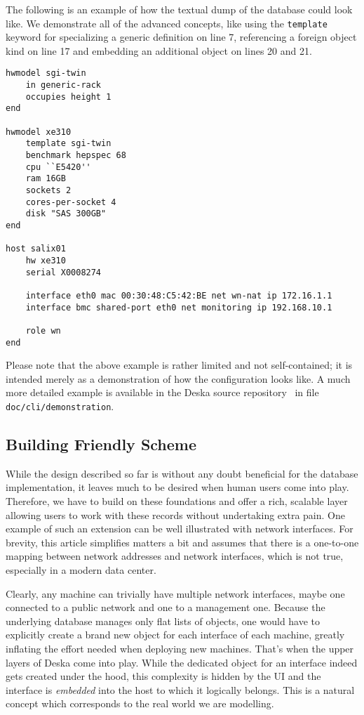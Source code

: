 \documentclass[a4paper]{jpconf}
\begin{document}
The following is an example of how the textual dump of the database could look like.  We demonstrate all of the advanced concepts, like
using the {\tt template} keyword for specializing a generic definition on line 7, referencing a foreign object kind on line 17 and
embedding an additional object on lines 20 and 21.

\lstset{numbers=left}
\noindent\begin{minipage}{\textwidth}
\begin{lstlisting}
hwmodel sgi-twin
    in generic-rack
    occupies height 1
end

hwmodel xe310
    template sgi-twin
    benchmark hepspec 68
    cpu ``E5420''
    ram 16GB
    sockets 2
    cores-per-socket 4
    disk "SAS 300GB"
end

host salix01
    hw xe310
    serial X0008274

    interface eth0 mac 00:30:48:C5:42:BE net wn-nat ip 172.16.1.1
    interface bmc shared-port eth0 net monitoring ip 192.168.10.1

    role wn
end
\end{lstlisting}
\end{minipage}

Please note that the above example is rather limited and not self-contained; it is intended merely as a demonstration of how the
configuration looks like.  A much more detailed example is available in the Deska source repository~\cite{deska-project} in file {\tt
doc/cli/demonstration}.

\subsection{Building Friendly Scheme}

While the design described so far is without any doubt beneficial for the database implementation, it leaves much to be desired when
human users come into play.  Therefore, we have to build on these foundations and offer a rich, scalable layer allowing users to work
with these records without undertaking extra pain.  One example of such an extension can be well illustrated with network interfaces.
For brevity, this article simplifies matters a bit and assumes that there is a one-to-one mapping between network addresses and network
interfaces, which is not true, especially in a modern data center.

Clearly, any machine can trivially have multiple network interfaces, maybe one connected to a public network and one to a management
one.  Because the underlying database manages only flat lists of objects, one would have to explicitly create a brand new object for
each interface of each machine, greatly inflating the effort needed when deploying new machines.  That's when the upper layers of Deska
come into play.  While the dedicated object for an interface indeed gets created under the hood, this complexity is hidden by the UI and the interface
is {\em embedded} into the host to which it logically belongs.  This is a natural concept which corresponds to the real world we are
modelling.
\end{document}
